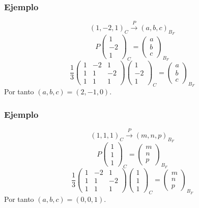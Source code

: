 \documentclass{beamer}
\begin{document}
    \begin{frame}
  \frametitle{Ejemplo}
  \[(1,-2,1)_C\xrightarrow{P}(a,b,c)_{B_F}\]
\[P \left(\begin{array}{r}1 \\-2 \\1\end{array}\right)_C  =  \left(\begin{array}{c}a \\b \\c\end{array}\right)_{B_F} \]
\[ \frac{1}{3} \left(\begin{array}{rrr}1 & -2 & 1 \\1 & 1 & -2 \\1 & 1 & 1\end{array}\right) \left(\begin{array}{r}1 \\-2 \\1\end{array}\right)_C  =  \left(\begin{array}{c}a \\b \\c\end{array}\right)_{B_F}\]
Por tanto $(a,b,c) = (2,-1,0)$.
  \end{frame}
  
      \begin{frame}
  \frametitle{Ejemplo}
\[(1,1,1)_C\xrightarrow{P}(m,n,p)_{B_F}\]
\[P \left(\begin{array}{r}1 \\1 \\1\end{array}\right)_C  =  \left(\begin{array}{c}m \\n \\p\end{array}\right)_{B_F} \]
\[  \frac{1}{3} \left(\begin{array}{rrr}1 & -2 & 1 \\1 & 1 & -2 \\1 & 1 & 1\end{array}\right) \left(\begin{array}{r}1 \\1 \\1\end{array}\right)_C  =  \left(\begin{array}{c}m \\n \\p\end{array}\right)_{B_F}\]
Por tanto $(a,b,c) = (0,0,1)$.
  \end{frame}
  
\end{document}
